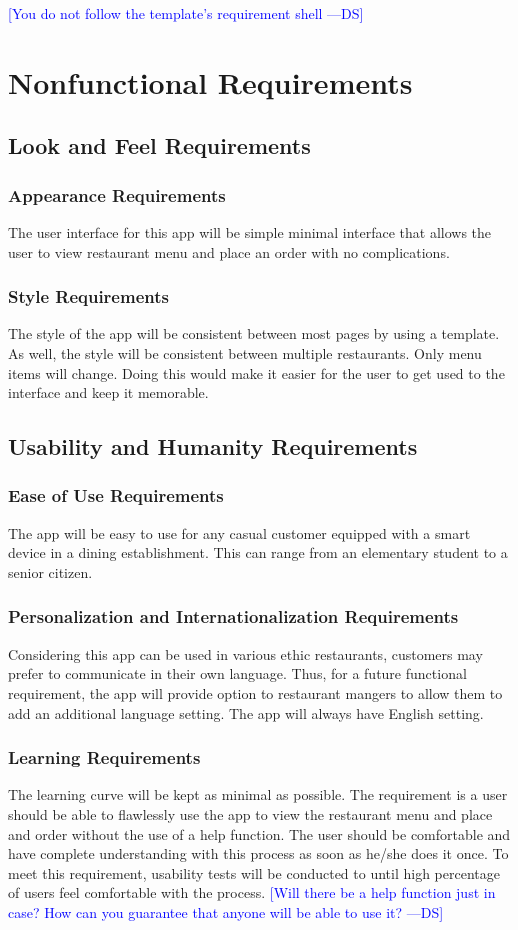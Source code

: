 \documentclass[12pt, titlepage]{article}
\newcommand{\authornote}[3]{\textcolor{#1}{[#3 ---#2]}}
\newcommand{\authornote}[3]{}
\newcommand{\ds}[1]{\authornote{blue}{DS}{#1}}
\begin{document}
\ds{You do not follow the template's requirement shell}

\section{Nonfunctional Requirements}
\subsection{Look and Feel Requirements}
\subsubsection{Appearance Requirements}
The user interface for this app will be simple minimal interface that allows the user to view restaurant menu and place an order with no complications. 
\subsubsection{Style Requirements}
The style of the app will be consistent between most pages by using a template. As well, the style will be consistent between multiple restaurants. Only menu items will change. Doing this would make it easier for the user to get used to the interface and keep it memorable.
\subsection{Usability and Humanity Requirements}
\subsubsection{Ease of Use Requirements}
 The app will be easy to use for any casual customer equipped with a smart device in a dining establishment. This can range from an elementary student to a senior citizen.  
\subsubsection{Personalization and Internationalization Requirements}
Considering this app can be used in various ethic restaurants, customers may prefer to communicate in their own language. Thus, for a future functional requirement, the app will provide option to restaurant mangers to allow them to add an additional language setting. The app will always have English setting.

\subsubsection{Learning Requirements}
The learning curve will be kept as minimal as possible. The requirement is a user should be able to flawlessly use the app to view the restaurant menu and place and order without the use of a help function. The user should be comfortable and have complete understanding with this process as soon as he/she does it once. To meet this requirement, usability tests will be conducted to until high percentage of users feel comfortable with the process.  
\ds{Will there be a help function just in case? 
How can you guarantee that anyone will be able to use it?}
\end{document}

